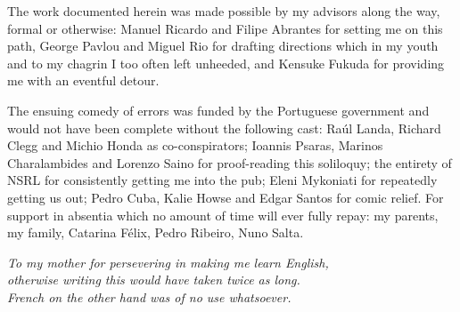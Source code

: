\begin{acknowledgements}

The work documented herein was made possible by my advisors along the way, formal or otherwise: Manuel Ricardo and Filipe Abrantes for setting me on this path, George Pavlou and Miguel Rio for drafting directions which in my youth and to my chagrin I too often left unheeded, and Kensuke Fukuda for providing me with an eventful detour.

The ensuing comedy of errors was funded by the Portuguese government and would not have been complete without the following cast: 
Ra\'{u}l Landa, Richard Clegg and Michio Honda as co-conspirators; 
Ioannis Psaras, Marinos Charalambides and Lorenzo Saino for proof-reading this soliloquy; 
the entirety of NSRL for consistently getting me into the pub;
Eleni Mykoniati for repeatedly getting us out;
Pedro Cuba, Kalie Howse and Edgar Santos for comic relief.
For support in absentia which no amount of time will ever fully repay: my parents, my family, Catarina F\'{e}lix, Pedro Ribeiro, Nuno Salta.

\end{acknowledgements}

\newpage
\hphantom{}\vfill
\newpage
\thispagestyle{empty}
\vspace*{1.75in}
\begin{flushright} 
\textit{
To my mother for persevering in making me learn English, \\
otherwise writing this would have taken twice as long. \\
French on the other hand was of no use whatsoever. \\
}
\end{flushright}



